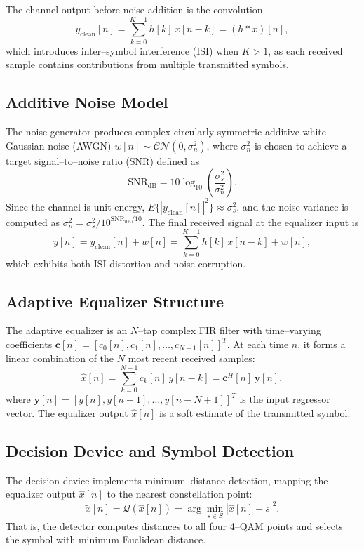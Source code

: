 \documentclass[12pt]{article}
\begin{document}
The channel output before noise addition is the convolution
\begin{equation}
y_{\text{clean}}[n] = \sum_{k=0}^{K-1} h[k]\,x[n-k] = (h*x)[n],
\end{equation}
which introduces inter--symbol interference (ISI) when $K > 1$, as each received sample contains contributions from multiple transmitted symbols.

\subsection{Additive Noise Model}
The noise generator produces complex circularly symmetric additive white Gaussian noise (AWGN) $w[n] \sim \mathcal{CN}(0, \sigma_n^2)$, where $\sigma_n^2$ is chosen to achieve a target signal--to--noise ratio (SNR) defined as
\begin{equation}
\text{SNR}_{\text{dB}} = 10\log_{10}\left(\frac{\sigma_s^2}{\sigma_n^2}\right).
\end{equation}
Since the channel is unit energy, $E\{|y_{\text{clean}}[n]|^2\} \approx \sigma_s^2$, and the noise variance is computed as $\sigma_n^2 = \sigma_s^2 / 10^{\text{SNR}_{\text{dB}}/10}$. The final received signal at the equalizer input is
\begin{equation}
y[n] = y_{\text{clean}}[n] + w[n] = \sum_{k=0}^{K-1} h[k]\,x[n-k] + w[n],
\end{equation}
which exhibits both ISI distortion and noise corruption.

\subsection{Adaptive Equalizer Structure}
The adaptive equalizer is an $N$--tap complex FIR filter with time--varying coefficients $\mathbf{c}[n] = [c_0[n], c_1[n], \ldots, c_{N-1}[n]]^T$. At each time $n$, it forms a linear combination of the $N$ most recent received samples:
\begin{equation}
\hat{x}[n] = \sum_{k=0}^{N-1} c_k[n]\,y[n-k] = \mathbf{c}^H[n]\,\mathbf{y}[n],
\end{equation}
where $\mathbf{y}[n] = [y[n], y[n-1], \ldots, y[n-N+1]]^T$ is the input regressor vector. The equalizer output $\hat{x}[n]$ is a soft estimate of the transmitted symbol.

\subsection{Decision Device and Symbol Detection}
The decision device implements minimum--distance detection, mapping the equalizer output $\hat{x}[n]$ to the nearest constellation point:
\begin{equation}
\tilde{x}[n] = \mathcal{Q}(\hat{x}[n]) = \arg\min_{s \in S} |\hat{x}[n] - s|^2.
\end{equation}
That is, the detector computes distances to all four 4--QAM points and selects the symbol with minimum Euclidean distance.
\end{document}
